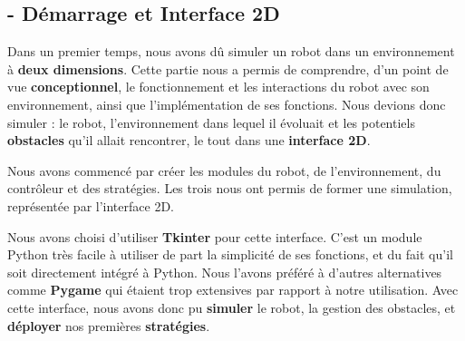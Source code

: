 \documentclass[12pt]{article}
\begin{document}

\subsection*{- Démarrage et Interface 2D}

\hspace{\parindent}Dans un premier temps, nous avons dû simuler un robot dans un environnement à \textbf{deux dimensions}. Cette partie nous a permis de comprendre, d'un point de vue \textbf{conceptionnel}, le fonctionnement et les interactions du robot avec son environnement, ainsi que l'implémentation de ses fonctions. Nous devions donc simuler : le robot, l’environnement dans lequel il évoluait et les potentiels \textbf{obstacles} qu’il allait rencontrer, le tout dans une \textbf{interface 2D}.

\hspace{\parindent}Nous avons commencé par créer les modules du robot, de l'environnement, du contrôleur et des stratégies. Les trois nous ont permis de former une simulation, représentée par l'interface 2D.

\hspace{\parindent}Nous avons choisi d'utiliser \textbf{Tkinter} pour cette interface. C’est un module Python très facile à utiliser de part la simplicité de ses fonctions, et du fait qu’il soit directement intégré à Python. Nous l'avons préféré à d'autres alternatives comme \textbf{Pygame} qui étaient trop extensives par rapport à notre utilisation. Avec cette interface, nous avons donc pu \textbf{simuler} le robot, la gestion des obstacles, et \textbf{déployer} nos premières \textbf{stratégies}.

\FloatBarrier
\end{document}
